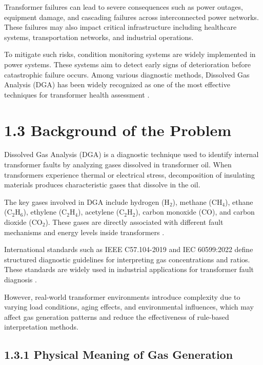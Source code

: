 Transformer failures can lead to severe consequences such as power outages, equipment damage, and cascading failures across interconnected power networks. These failures may also impact critical infrastructure including healthcare systems, transportation networks, and industrial operations.

To mitigate such risks, condition monitoring systems are widely implemented in power systems. These systems aim to detect early signs of deterioration before catastrophic failure occurs. Among various diagnostic methods, Dissolved Gas Analysis (DGA) has been widely recognized as one of the most effective techniques for transformer health assessment \parencite{Ali2023ConventionalDGA}.

\section{1.3 Background of the Problem}

Dissolved Gas Analysis (DGA) is a diagnostic technique used to identify internal transformer faults by analyzing gases dissolved in transformer oil. When transformers experience thermal or electrical stress, decomposition of insulating materials produces characteristic gases that dissolve in the oil.

The key gases involved in DGA include hydrogen (H$_2$), methane (CH$_4$), ethane (C$_2$H$_6$), ethylene (C$_2$H$_4$), acetylene (C$_2$H$_2$), carbon monoxide (CO), and carbon dioxide (CO$_2$). These gases are directly associated with different fault mechanisms and energy levels inside transformers \parencite{IEC60599}.

International standards such as IEEE C57.104-2019 and IEC 60599:2022 define structured diagnostic guidelines for interpreting gas concentrations and ratios. These standards are widely used in industrial applications for transformer fault diagnosis \parencite{IEEEC57104}.

However, real-world transformer environments introduce complexity due to varying load conditions, aging effects, and environmental influences, which may affect gas generation patterns and reduce the effectiveness of rule-based interpretation methods.

\subsection{1.3.1 Physical Meaning of Gas Generation}

